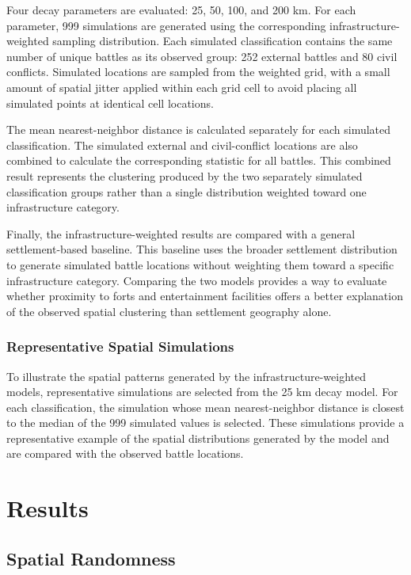 \documentclass[
  letterpaper,
  DIV=11,
  numbers=noendperiod]{scrartcl}
\begin{document}
Four decay parameters are evaluated: 25, 50, 100, and 200 km. For each
parameter, 999 simulations are generated using the corresponding
infrastructure-weighted sampling distribution. Each simulated
classification contains the same number of unique battles as its
observed group: 252 external battles and 80 civil conflicts. Simulated
locations are sampled from the weighted grid, with a small amount of
spatial jitter applied within each grid cell to avoid placing all
simulated points at identical cell locations.

The mean nearest-neighbor distance is calculated separately for each
simulated classification. The simulated external and civil-conflict
locations are also combined to calculate the corresponding statistic for
all battles. This combined result represents the clustering produced by
the two separately simulated classification groups rather than a single
distribution weighted toward one infrastructure category.

Finally, the infrastructure-weighted results are compared with a general
settlement-based baseline. This baseline uses the broader settlement
distribution to generate simulated battle locations without weighting
them toward a specific infrastructure category. Comparing the two models
provides a way to evaluate whether proximity to forts and entertainment
facilities offers a better explanation of the observed spatial
clustering than settlement geography alone.

\subsubsection{Representative Spatial
Simulations}\label{representative-spatial-simulations}

To illustrate the spatial patterns generated by the
infrastructure-weighted models, representative simulations are selected
from the 25 km decay model. For each classification, the simulation
whose mean nearest-neighbor distance is closest to the median of the 999
simulated values is selected. These simulations provide a representative
example of the spatial distributions generated by the model and are
compared with the observed battle locations.

\section{Results}\label{results}

\subsection{Spatial Randomness}\label{spatial-randomness}
\end{document}
